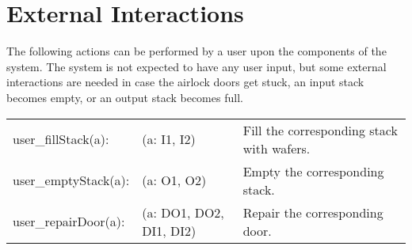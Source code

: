 \section{External Interactions}

The following actions can be performed by a user upon the components of the system. The system is not expected to have any user input, but some external interactions are needed in case the airlock doors get stuck, an input stack becomes empty, or an output stack becomes full.

\begin{tabular}{ l l l }
	user_fillStack(a): & (a: I1, I2) & Fill the corresponding stack with wafers. \\
	user_emptyStack(a): & (a: O1, O2) & Empty the corresponding stack. \\
	user_repairDoor(a): & (a: DO1, DO2, DI1, DI2) & Repair the corresponding door. \\
\end{tabular}